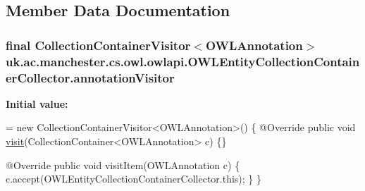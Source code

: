 \subsection{Member Data Documentation}
\hypertarget{classuk_1_1ac_1_1manchester_1_1cs_1_1owl_1_1owlapi_1_1_o_w_l_entity_collection_container_collector_a9a3b03b764e3ecc37dc47f2bc844377c}{
\subsubsection[{annotation\-Visitor}]{\setlength{\rightskip}{0pt plus 5cm}final Collection\-Container\-Visitor$<${\bf O\-W\-L\-Annotation}$>$ uk.\-ac.\-manchester.\-cs.\-owl.\-owlapi.\-O\-W\-L\-Entity\-Collection\-Container\-Collector.\-annotation\-Visitor\hspace{0.3cm}{\ttfamily [private]}}}\label{classuk_1_1ac_1_1manchester_1_1cs_1_1owl_1_1owlapi_1_1_o_w_l_entity_collection_container_collector_a9a3b03b764e3ecc37dc47f2bc844377c}
{\bfseries Initial value\-:}
\begin{DoxyCode}
= \textcolor{keyword}{new} CollectionContainerVisitor<OWLAnnotation>() \{
        @Override
        \textcolor{keyword}{public} \textcolor{keywordtype}{void} \hyperlink{classuk_1_1ac_1_1manchester_1_1cs_1_1owl_1_1owlapi_1_1_o_w_l_entity_collection_container_collector_a6d9e9fb5867f2874b34bec52560ca21b}{visit}(CollectionContainer<OWLAnnotation> c) \{\}

        @Override
        \textcolor{keyword}{public} \textcolor{keywordtype}{void} visitItem(OWLAnnotation c) \{
            c.accept(OWLEntityCollectionContainerCollector.this);
        \}
    \}
\end{DoxyCode}
